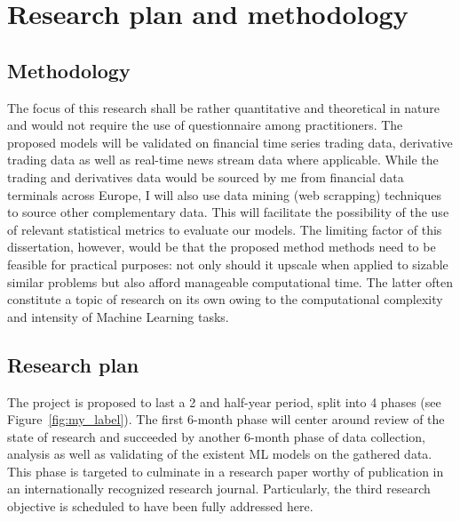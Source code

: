 \documentclass[a4paper,11pt]{scrartcl}
\newcommand{\reffig}[1]{Figure~\ref{#1}}
\begin{document}
%
\section{Research plan and methodology}
\subsection{Methodology}
The focus of this research shall be rather quantitative and theoretical in nature and would not require the use of questionnaire among practitioners.  The proposed models will be validated on financial time series trading data, derivative trading data as well as real-time news stream data where applicable. While the trading and derivatives data would be sourced by me from financial data terminals across Europe, I will also use data mining (web scrapping) techniques to source other complementary data. This will facilitate the possibility of the use of relevant statistical metrics to evaluate our models. The limiting factor of this dissertation, however, would be that the proposed method methods need to be feasible for practical purposes: not only should it upscale when applied to sizable similar problems but also afford manageable computational time. The latter often constitute a topic of research on its own owing to the computational complexity and intensity of Machine Learning tasks.

%
\subsection{Research plan}
The project is proposed to last a 2 and half-year period, split into 4 phases (see \reffig{fig:my_label}). The first 6-month phase will center around review of the state of research and succeeded by another 6-month phase of data collection, analysis as well as validating of the existent ML models on the gathered data. This phase is targeted to culminate in a research paper worthy of publication in an internationally recognized research journal. Particularly, the third research objective is scheduled to have been fully addressed here.
\end{document}
